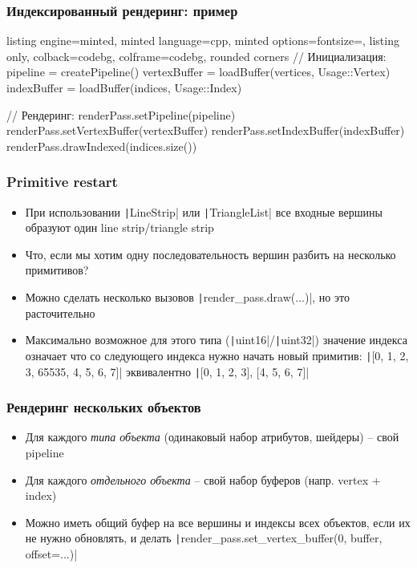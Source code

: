 \documentclass[10pt]{beamer}
\begin{document}
\begin{frame}[fragile]
\frametitle{Индексированный рендеринг: пример}
\begin{tcblisting}{listing engine=minted, minted language=cpp, minted options={fontsize=\scriptsize}, listing only, colback=codebg, colframe=codebg, rounded corners}
// Инициализация:
pipeline = createPipeline()
vertexBuffer = loadBuffer(vertices, Usage::Vertex)
indexBuffer = loadBuffer(indices, Usage::Index)

// Рендеринг:
renderPass.setPipeline(pipeline)
renderPass.setVertexBuffer(vertexBuffer)
renderPass.setIndexBuffer(indexBuffer)
renderPass.drawIndexed(indices.size())
\end{tcblisting}
\end{frame}

\begin{frame}[fragile]
\frametitle{Primitive restart}
\begin{itemize}
\item При использовании \texttt|LineStrip| или \texttt|TriangleList| все входные вершины образуют один line strip/triangle strip
\pause
\item Что, если мы хотим одну последовательность вершин разбить на несколько примитивов?
\pause
\item Можно сделать несколько вызовов \texttt|render_pass.draw(...)|, но это расточительно
\pause
\item Максимально возможное для этого типа (\texttt|uint16|/\texttt|uint32|) значение индекса означает что со следующего индекса нужно начать новый примитив:
\texttt|[0, 1, 2, 3, 65535, 4, 5, 6, 7]| эквивалентно
\texttt|[0, 1, 2, 3], [4, 5, 6, 7]|
\end{itemize}
\end{frame}

\begin{frame}[fragile]
\frametitle{Рендеринг нескольких объектов}
\begin{itemize}
\item Для каждого \textit{типа объекта} (одинаковый набор атрибутов, шейдеры) -- свой pipeline
\pause
\item Для каждого \textit{отдельного объекта} -- свой набор буферов (напр. vertex + index)
\pause
\item Можно иметь общий буфер на все вершины и индексы всех объектов, если их не нужно обновлять, и делать \texttt|render_pass.set_vertex_buffer(0, buffer, offset=...)|
\end{itemize}
\end{frame}
\end{document}
